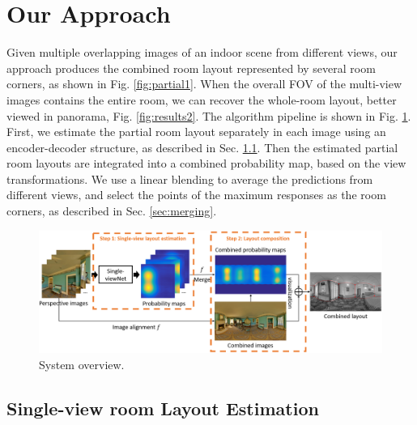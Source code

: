 \section{Our Approach}
Given multiple overlapping images of an indoor scene from different views, our approach produces the combined room layout represented by several room corners, as shown in Fig. \ref{fig:partial1}. When the overall FOV of the multi-view images contains the entire room, we can recover the whole-room layout, better viewed in panorama, Fig. \ref{fig:results2}. 
%
The algorithm pipeline is shown in Fig. \ref{fig:overview}. First, we estimate the partial room layout separately in each image using an encoder-decoder structure, as described in Sec. \ref{sec:layout}. Then the estimated partial room layouts are integrated into a combined probability map, based on the view transformations. 
We  use a linear blending to average the predictions from different views, and select the points of the maximum responses as the room corners, as described in Sec. \ref{sec:merging}. 


\begin{figure}[ht]
	\centering
	\includegraphics[width=\linewidth]{figs/ppline.png}
	\caption{System overview. }
	\label{fig:overview}
\end{figure}

\subsection{Single-view room Layout Estimation}
\label{sec:layout}

